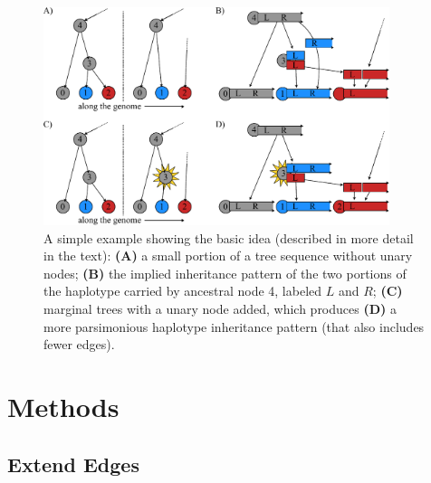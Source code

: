\documentclass[10pt,twoside,lineno]{gsajnl}
\begin{document}
\begin{figure}
    \begin{center}
    \includegraphics[width=0.9\textwidth]{conceptual_figure.pdf}
    \end{center}
    \caption{
        A simple example showing the basic idea
        (described in more detail in the text):
        \textbf{(A)} a small portion of a tree sequence without unary nodes;
        \textbf{(B)} the implied inheritance pattern of the two portions of the haplotype carried by ancestral node 4,
        labeled $L$ and $R$;
        \textbf{(C)} marginal trees with a unary node added,
        which produces \textbf{(D)} a more parsimonious haplotype inheritance pattern
        (that also includes fewer edges).
        \label{fig:conceptual}
    }
\end{figure}

\section{Methods}

\subsection{Extend Edges}
\end{document}
